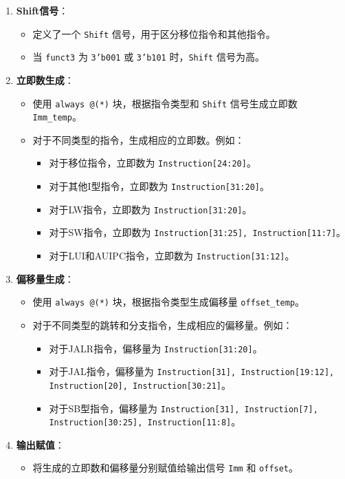 \documentclass[12pt,hyperref,a4paper,UTF8]{ctexart}
\begin{document}
\begin{enumerate}
    \item \textbf{Shift信号}：
    \begin{itemize}
        \item 定义了一个 \texttt{Shift} 信号，用于区分移位指令和其他指令。
        \item 当 \texttt{funct3} 为 \texttt{3'b001} 或 \texttt{3'b101} 时，\texttt{Shift} 信号为高。
    \end{itemize}

    \item \textbf{立即数生成}：
    \begin{itemize}
        \item 使用 \texttt{always @(*)} 块，根据指令类型和 \texttt{Shift} 信号生成立即数 \texttt{Imm\_temp}。
        \item 对于不同类型的指令，生成相应的立即数。例如：
        \begin{itemize}
            \item 对于移位指令，立即数为 \texttt{Instruction[24:20]}。
            \item 对于其他I型指令，立即数为 \texttt{Instruction[31:20]}。
            \item 对于LW指令，立即数为 \texttt{Instruction[31:20]}。
            \item 对于SW指令，立即数为 \texttt{Instruction[31:25], Instruction[11:7]}。
            \item 对于LUI和AUIPC指令，立即数为 \texttt{Instruction[31:12]}。
        \end{itemize}
    \end{itemize}

    \item \textbf{偏移量生成}：
    \begin{itemize}
        \item 使用 \texttt{always @(*)} 块，根据指令类型生成偏移量 \texttt{offset\_temp}。
        \item 对于不同类型的跳转和分支指令，生成相应的偏移量。例如：
        \begin{itemize}
            \item 对于JALR指令，偏移量为 \texttt{Instruction[31:20]}。
            \item 对于JAL指令，偏移量为 \texttt{Instruction[31], Instruction[19:12], Instruction[20], Instruction[30:21]}。
            \item 对于SB型指令，偏移量为 \texttt{Instruction[31], Instruction[7], Instruction[30:25], Instruction[11:8]}。
        \end{itemize}
    \end{itemize}

    \item \textbf{输出赋值}：
    \begin{itemize}
        \item 将生成的立即数和偏移量分别赋值给输出信号 \texttt{Imm} 和 \texttt{offset}。
    \end{itemize}
\end{enumerate}
\end{document}
